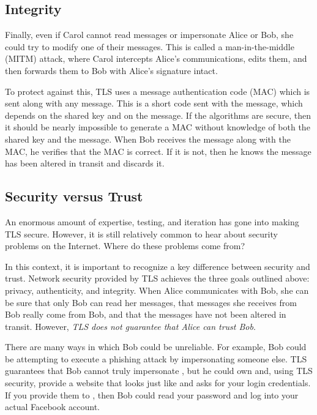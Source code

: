 \subsection{Integrity}

Finally, even if Carol cannot read messages or impersonate Alice or Bob, she could try to modify one of their messages. This is called a man-in-the-middle (MITM) attack, where Carol intercepts Alice's communications, edits them, and then forwards them to Bob with Alice's signature intact.

To protect against this, TLS uses a message authentication code (MAC) which is sent along with any message. This is a short code sent with the message, which depends on the shared key and on the message. If the algorithms are secure, then it should be nearly impossible to generate a MAC without knowledge of both the shared key and the message. When Bob receives the message along with the MAC, he verifies that the MAC is correct. If it is not, then he knows the message has been altered in transit and discards it.

\subsection{Security versus Trust}

An enormous amount of expertise, testing, and iteration has gone into making TLS secure. However, it is still relatively common to hear about security problems on the Internet. Where do these problems come from?

In this context, it is important to recognize a key difference between security and trust. Network security provided by TLS achieves the three goals outlined above: privacy, authenticity, and integrity. When Alice communicates with Bob, she can be sure that only Bob can read her messages, that messages she receives from Bob really come from Bob, and that the messages have not been altered in transit. However, \emph{TLS does not guarantee that Alice can trust Bob}.

There are many ways in which Bob could be unreliable. For example, Bob could be attempting to execute a phishing attack by impersonating someone else. TLS guarantees that Bob cannot truly impersonate , but he could own  and, using TLS security, provide a website that looks just like  and asks for your login credentials. If you provide them to , then Bob could read your password and log into your actual Facebook account.


